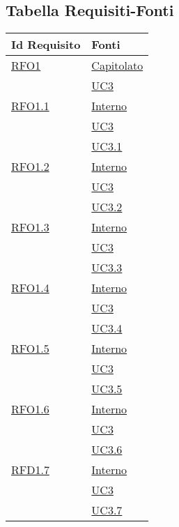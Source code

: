 \newpage
\subsection{Tabella Requisiti-Fonti}
\normalsize
\begin{longtable}{|>{\centering}m{5cm}|m{5cm}<{\centering}|}
\hline 
\textbf{Id Requisito} & \textbf{Fonti}\\
\hline
\endhead


\hyperlink{RFO1}{RFO1}
& \hyperlink{Capitolato}{Capitolato}\\
& \hyperref[UC3]{UC3}\\ \hline

\hyperlink{RFO1.1}{RFO1.1} 
& \hyperlink{Interno}{Interno}\\
& \hyperref[UC3]{UC3}\\
& \hyperref[UC3.1]{UC3.1}\\ \hline

\hyperlink{RFD1.2}{RFO1.2} 
& \hyperlink{Interno}{Interno}\\
& \hyperref[UC3]{UC3}\\
& \hyperref[UC3.2]{UC3.2}\\ \hline

\hyperlink{RFO1.3}{RFO1.3} 
& \hyperlink{Interno}{Interno}\\
& \hyperref[UC3]{UC3}\\
& \hyperref[UC3.3]{UC3.3}\\ \hline

\hyperlink{RFO1.4}{RFO1.4} 
& \hyperlink{Interno}{Interno}\\
& \hyperref[UC3]{UC3}\\
& \hyperref[UC3.4]{UC3.4}\\ \hline

\hyperlink{RFO1.5}{RFO1.5} 
& \hyperlink{Interno}{Interno}\\
& \hyperref[UC3]{UC3}\\
& \hyperref[UC3.5]{UC3.5}\\ \hline

\hyperlink{RFO1.6}{RFO1.6} 
& \hyperlink{Interno}{Interno}\\
& \hyperref[UC3]{UC3}\\
& \hyperref[UC3.6]{UC3.6}\\ \hline

\hyperlink{RFD1.7}{RFD1.7} 
& \hyperlink{Interno}{Interno}\\
& \hyperref[UC3]{UC3}\\
& \hyperref[UC3.7]{UC3.7}\\ \hline


\end{longtable}
